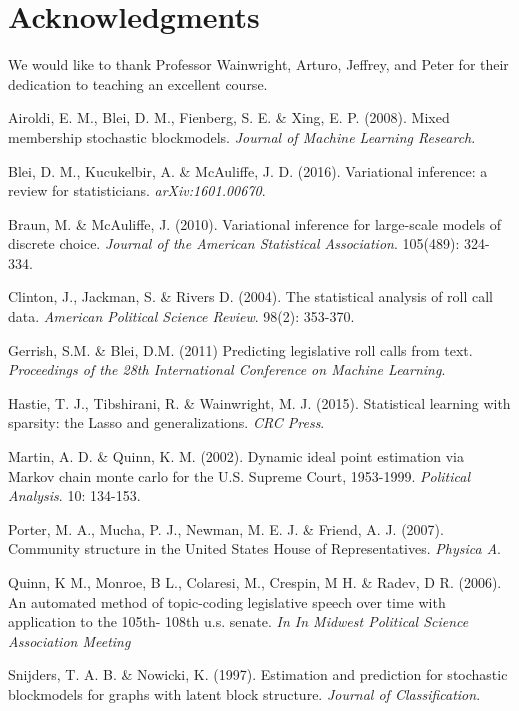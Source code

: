 \documentclass{article}
\begin{document}
\section*{Acknowledgments}
We would like to thank Professor Wainwright, Arturo, Jeffrey, and Peter for their dedication to teaching an excellent course. %
\begin{thebibliography}{10}

 Airoldi, E. M., Blei, D. M., Fienberg, S. E. \& Xing, E. P. (2008). Mixed membership stochastic blockmodels. \textit{Journal of Machine Learning Research}.

 Blei, D. M., Kucukelbir, A. \& McAuliffe, J. D. (2016). Variational inference: a review for statisticians. {\sl arXiv:1601.00670}.

 Braun, M. \& McAuliffe, J. (2010). Variational inference for large-scale models of discrete choice. {\itshape Journal of the American Statistical Association}. 105(489): 324-334. 

 Clinton, J., Jackman, S. \& Rivers D. (2004). The statistical analysis of roll call data. {\itshape American Political Science Review}. 98(2): 353-370. 

 Gerrish, S.M. \& Blei, D.M. (2011) Predicting legislative roll calls from text. {\it Proceedings of the 28th International Conference on Machine Learning}.

 Hastie, T. J., Tibshirani, R. \& Wainwright, M. J. (2015). Statistical learning with sparsity: the Lasso and generalizations. {\itshape CRC Press}. 

 Martin, A. D. \& Quinn, K. M. (2002). Dynamic ideal point estimation via Markov chain monte carlo for the U.S. Supreme Court, 1953-1999. \textit{Political Analysis}. 10: 134-153. 

 Porter, M. A., Mucha, P. J., Newman, M. E. J. \& Friend, A. J. (2007). Community structure in the United States House of Representatives. {\it Physica A}.


 Quinn, K M., Monroe, B L., Colaresi, M., Crespin, M H. \& Radev, D R. (2006). An automated method of topic-coding legislative
speech over time with application to the 105th-
108th u.s. senate. {\itshape In In Midwest Political Science
Association Meeting}

 Snijders, T. A. B. \& Nowicki, K. (1997). Estimation and prediction for stochastic blockmodels for graphs with latent block structure. {\itshape Journal of Classification}.


\end{thebibliography}
\end{document}
